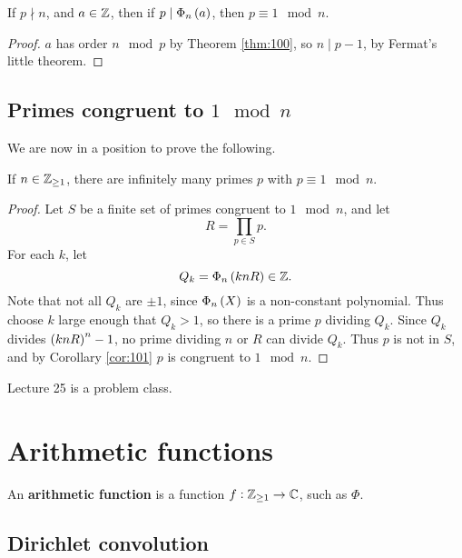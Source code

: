 \begin{corollary}
\label{cor:101}
If $ p \nmid n $, and $ a \in \mathbb{Z} $, then if $ p \mid \Phi_n\br{a} $, then $ p \equiv 1 \mod n $.
\end{corollary}

\begin{proof}
$ a $ has order $ n \mod p $ by Theorem \ref{thm:100}, so $ n \mid p - 1 $, by Fermat's little theorem.
\end{proof}

\subsection{Primes congruent to \texorpdfstring{$ 1 \mod n $}{1 mod n}}

We are now in a position to prove the following.

\begin{theorem}
If $ n \in \mathbb{Z}_{\ge 1} $, there are infinitely many primes $ p $ with $ p \equiv 1 \mod n $.
\end{theorem}

\begin{proof}
Let $ S $ be a finite set of primes congruent to $ 1 \mod n $, and let
$$ R = \prod_{p \in S} p. $$
For each $ k $, let
$$ Q_k = \Phi_n\br{knR} \in \Z. $$
Note that not all $ Q_k $ are $ \pm 1 $, since $ \Phi_n\br{X} $ is a non-constant polynomial. Thus choose $ k $ large enough that $ Q_k > 1 $, so there is a prime $ p $ dividing $ Q_k $. Since $ Q_k $ divides $ \br{knR}^n - 1 $, no prime dividing $ n $ or $ R $ can divide $ Q_k $. Thus $ p $ is not in $ S $, and by Corollary \ref{cor:101} $ p $ is congruent to $ 1 \mod n $.
\end{proof}


Lecture 25 is a problem class.

\pagebreak

\section{Arithmetic functions}


An \textbf{arithmetic function} is a function $ f : \mathbb{Z}_{\ge 1} \to \mathbb{C} $, such as $ \Phi $.

\subsection{Dirichlet convolution}

